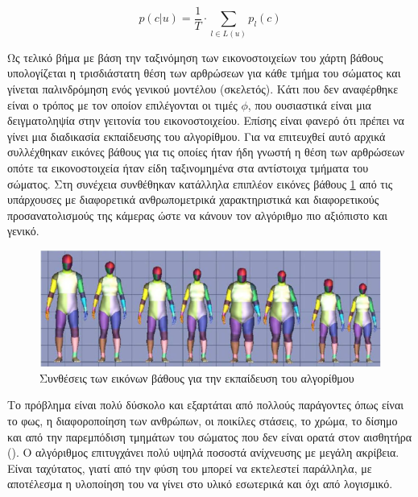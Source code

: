 \begin{equation}
    p(c|u) = \frac{1}{T} \cdot \sum_{l \in L(u)} p_{l}(c)
    \label{equ:kinect-algorithm-pixel-probability}
\end{equation}

Ως τελικό βήμα με βάση την ταξινόμηση των εικονοστοιχείων του χάρτη βάθους υπολογίζεται η τρισδιάστατη θέση των αρθρώσεων για κάθε τμήμα του σώματος και γίνεται παλινδρόμηση ενός γενικού μοντέλου (σκελετός). Κάτι που δεν αναφέρθηκε είναι ο τρόπος με τον οποίον επιλέγονται οι τιμές $\phi$, που ουσιαστικά είναι μια δειγματοληψία στην γειτονία του εικονοστοιχείου. Επίσης είναι φανερό ότι πρέπει να γίνει μια διαδικασία εκπαίδευσης του αλγορίθμου. Για να επιτευχθεί αυτό αρχικά συλλέχθηκαν εικόνες βάθους για τις οποίες ήταν ήδη γνωστή η θέση των αρθρώσεων οπότε τα εικονοστοιχεία ήταν είδη ταξινομημένα στα αντίστοιχα τμήματα του σώματος. Στη συνέχεια συνθέθηκαν κατάλληλα επιπλέον εικόνες βάθους \ref{fig:kinect-data-synthesis} από τις υπάρχουσες με διαφορετικά ανθρωπομετρικά χαρακτηριστικά και διαφορετικούς προσανατολισμούς της κάμερας ώστε να κάνουν τον αλγόριθμο πιο αξιόπιστο και γενικό.

\begin{figure}[H]
    \centering
    \includegraphics[width=.8\textwidth, keepaspectratio]{fig/kinect-data-synthesis.png}
    \caption{Συνθέσεις των εικόνων βάθους για την εκπαίδευση του αλγορίθμου \cite{shotton11}}
    \label{fig:kinect-data-synthesis}
\end{figure}

Το πρόβλημα είναι πολύ δύσκολο και εξαρτάται από πολλούς παράγοντες όπως είναι το φως, η διαφοροποίηση των ανθρώπων, οι ποικίλες στάσεις, το χρώμα, το δίσημο και από την παρεμπόδιση τμημάτων του σώματος που δεν είναι ορατά στον αισθητήρα (). Ο αλγόριθμος επιτυγχάνει πολύ υψηλά ποσοστά ανίχνευσης με μεγάλη ακρίβεια. Είναι ταχύτατος, γιατί από την φύση του μπορεί να εκτελεστεί παράλληλα, με αποτέλεσμα η υλοποίηση του να γίνει στο υλικό εσωτερικά και όχι από λογισμικό.

